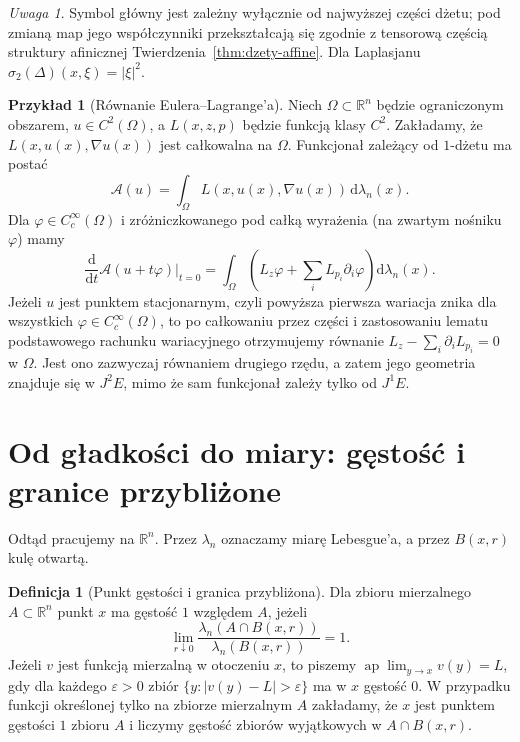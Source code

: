 \documentclass[11pt,a4paper,oneside]{book}
\numberwithin{equation}{chapter}
\theoremstyle{plain}
\theoremstyle{definition}
\newtheorem{definicja}[twierdzenie]{Definicja}
\newtheorem{przyklad}[twierdzenie]{Przykład}
\theoremstyle{remark}
\newtheorem{uwaga}[twierdzenie]{Uwaga}
\begin{document}
\begin{uwaga}
Symbol główny jest zależny wyłącznie od najwyższej części
dżetu; pod zmianą map jego współczynniki przekształcają się
zgodnie z tensorową częścią struktury afinicznej
Twierdzenia~\ref{thm:dzety-affine}. Dla Laplasjanu
$\sigma_2(\Delta)(x,\xi)=|\xi|^2$.
\end{uwaga}

\begin{przyklad}[Równanie Eulera--Lagrange'a]
Niech $\Omega\subset\mathbb R^n$ będzie ograniczonym obszarem,
$u\in C^2(\Omega)$, a $L(x,z,p)$ będzie funkcją klasy $C^2$.
Zakładamy, że $L(x,u(x),\nabla u(x))$ jest całkowalna na $\Omega$.
Funkcjonał zależący od $1$-dżetu ma postać
\[
 \mathcal A(u)=\int_\Omega L(x,u(x),\nabla u(x))
 \,\mathrm d\lambda_n(x).
\]
Dla $\varphi\in C_c^\infty(\Omega)$ i zróżniczkowanego
pod całką wyrażenia (na zwartym nośniku $\varphi$) mamy
\[
 \frac{\mathrm d}{\mathrm dt}\mathcal A(u+t\varphi)\big|_{t=0}
 =\int_\Omega\left(L_z\varphi+
 \sum_i L_{p_i}\partial_i\varphi\right)\mathrm d\lambda_n(x).
\]
Jeżeli $u$ jest punktem stacjonarnym, czyli powyższa
pierwsza wariacja znika dla wszystkich
$\varphi\in C_c^\infty(\Omega)$, to po całkowaniu
przez części i zastosowaniu lematu podstawowego rachunku
wariacyjnego otrzymujemy równanie
$L_z-\sum_i\partial_i L_{p_i}=0$ w $\Omega$.
Jest ono zazwyczaj równaniem drugiego rzędu, a zatem
jego geometria znajduje się w $J^2E$, mimo że
sam funkcjonał zależy tylko od $J^1E$.
\end{przyklad}

\section{Od gładkości do miary: gęstość i granice przybliżone}
Odtąd pracujemy na $\mathbb R^n$. Przez $\lambda_n$ oznaczamy
miarę Lebesgue'a, a przez $B(x,r)$ kulę otwartą.

\begin{definicja}[Punkt gęstości i granica przybliżona]
\label{def:dzety-ap-limit}
Dla zbioru mierzalnego $A\subset\mathbb R^n$ punkt $x$
ma gęstość $1$ względem $A$, jeżeli
\[
 \lim_{r\downarrow0}
 \frac{\lambda_n(A\cap B(x,r))}{\lambda_n(B(x,r))}=1.
\]
Jeżeli $v$ jest funkcją mierzalną w otoczeniu $x$,
to piszemy $\operatorname{ap}\!\lim_{y\to x}v(y)=L$,
gdy dla każdego $\varepsilon>0$ zbiór
$\{y:|v(y)-L|>\varepsilon\}$ ma w $x$ gęstość $0$.
W przypadku funkcji określonej tylko na zbiorze mierzalnym
$A$ zakładamy, że $x$ jest punktem gęstości $1$ zbioru $A$
i liczymy gęstość zbiorów wyjątkowych w $A\cap B(x,r)$.
\end{definicja}
\end{document}
